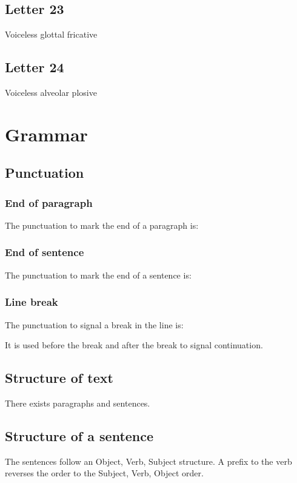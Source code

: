 \documentclass{book}
\newcommand{\display}[1]{\begin{center}\resizebox{2cm}{!}{\texttt{[image: \#1]}}\end{center}}
\begin{document}
\section{Letter 23}
Voiceless glottal fricative

\display{letters/consonants/23.JPG}


\section{Letter 24}
Voiceless alveolar plosive

\display{letters/consonants/24.JPG}



\chapter{Grammar}
\section{Punctuation}
\subsection{End of paragraph}
The punctuation to mark the end of a paragraph is:

\display{punctuation/paragraph-end.png}

\subsection{End of sentence}
The punctuation to mark the end of a sentence is:

\display{punctuation/sentence-end.png}

\subsection{Line break}
The punctuation to signal a break in the line is:

\display{punctuation/line-break.png}

It is used before the break and after the break to signal continuation.

\section{Structure of text}
There exists paragraphs and sentences.

\section{Structure of a sentence}
The sentences follow an Object, Verb, Subject structure.  A prefix to the verb reverses the order to the Subject, Verb, Object order.
\end{document}

